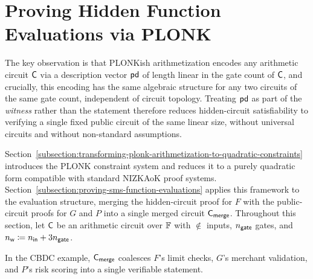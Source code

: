 \section{Proving Hidden Function Evaluations via PLONK}
\label{section:proving-function-evaluations-via-plonk}

The key observation is that PLONKish arithmetization encodes any arithmetic circuit $\mathsf{C}$
via a description vector $\mathsf{pd}$ of length linear in the gate count of $\mathsf{C}$,
and crucially, this encoding has the same algebraic structure for any two circuits
of the same gate count, independent of circuit topology.
Treating $\mathsf{pd}$ as part of the \emph{witness} rather than the statement
therefore reduces hidden-circuit satisfiability to verifying a single fixed public circuit
of the same linear size, without universal circuits and without non-standard assumptions.

Section~\ref{subsection:transforming-plonk-arithmetization-to-quadratic-constraints}
introduces the PLONK constraint system and reduces it to a purely quadratic form
compatible with standard NIZKAoK proof systems.
Section~\ref{subsection:proving-sms-function-evaluations}
applies this framework to the \SMS evaluation structure,
merging the hidden-circuit proof for $F$ with the public-circuit proofs for $G$ and $P$
into a single merged circuit $\mathsf{C}_\mathsf{merge}$.
%
Throughout this section, let $\mathsf{C}$ be an arithmetic circuit over $\mathbb{F}$
with $\nin$ inputs, $n_\mathsf{gate}$ gates, and $n_\mathsf{w} \coloneqq n_\mathsf{in} + 3n_\mathsf{gate}$.

In the CBDC example, $\mathsf{C}_\mathsf{merge}$ coalesces $F$'s limit checks, $G$'s merchant validation, and $P$'s risk scoring into a single verifiable statement.



